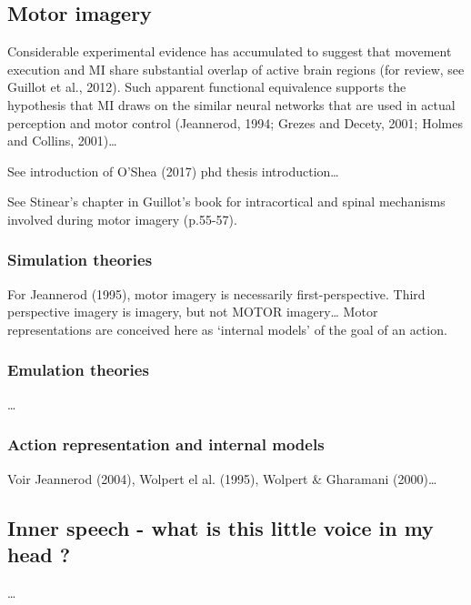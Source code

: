 \documentclass[a4paper,11pt,oneside,oldfontcommands]{memoir}
\begin{document}
\subsection{Motor imagery}\label{motor-imagery}

Considerable experimental evidence has accumulated to suggest that
movement execution and MI share substantial overlap of active brain
regions (for review, see Guillot et al., 2012). Such apparent functional
equivalence supports the hypothesis that MI draws on the similar neural
networks that are used in actual perception and motor control
(Jeannerod, 1994; Grezes and Decety, 2001; Holmes and Collins,
2001)\ldots{}

See introduction of O'Shea (2017) phd thesis introduction\ldots{}

See Stinear's chapter in Guillot's book for intracortical and spinal
mechanisms involved during motor imagery (p.55-57).

\subsubsection{Simulation theories}\label{simulation-theories}

For Jeannerod (1995), motor imagery is necessarily first-perspective.
Third perspective imagery is imagery, but not MOTOR imagery\ldots{}
Motor representations are conceived here as `internal models' of the
goal of an action.

\subsubsection{Emulation theories}\label{emulation-theories}

\ldots{}

\subsubsection{Action representation and internal
models}\label{action-representation-and-internal-models}

Voir Jeannerod (2004), Wolpert el al. (1995), Wolpert \& Gharamani
(2000)\ldots{}

\subsection{Inner speech - what is this little voice in my head
?}\label{inner-speech---what-is-this-little-voice-in-my-head}

\ldots{}
\end{document}
